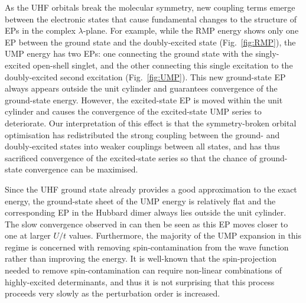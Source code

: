 \documentclass[aps,prb,reprint,noshowkeys,linenumbers,superscriptaddress]{revtex4-1}
\newcommand{\hugh}[1]{\textcolor{hughgreen}{#1}}
\begin{document}
As the UHF orbitals break the molecular symmetry, new coupling terms emerge between the electronic states that
cause fundamental changes to the structure of EPs in the complex $\lambda$-plane.
For example, while the RMP energy shows only one EP between the ground state and 
the doubly-excited state (Fig.~\ref{fig:RMP}), the UMP energy has two EPs: one connecting the ground state with the
singly-excited open-shell singlet, and the other connecting this single excitation to the 
doubly-excited second excitation (Fig.~\ref{fig:UMP}).
\hugh{%
This new ground-state EP always appears outside the unit cylinder and guarantees convergence of the ground-state energy.
However, the excited-state EP is moved within} the unit cylinder and causes the 
convergence of the excited-state UMP series to deteriorate.
\hugh{Our interpretation of this effect is that the symmetry-broken orbital optimisation has redistributed the strong 
coupling between the ground- and doubly-excited states into weaker couplings between all states, and has thus
sacrificed convergence of the excited-state series so that the chance of ground-state convergence can be maximised.}

Since the UHF ground state already provides a good approximation to the exact energy, the ground-state sheet of
the UMP energy is relatively flat and the corresponding EP in the Hubbard dimer always lies outside the unit cylinder.
\hugh{The slow convergence observed in \cite{Gill_1988} can then be seen as this EP 
moves closer to one at larger $U/t$ values.}
Furthermore, the majority of the UMP expansion in this regime is concerned with removing spin-contamination from the wave 
function \hugh{rather than improving the energy.
It is well-known that the spin-projection needed to remove spin-contamination can require non-linear combinations
of highly-excited determinants,\cite{Lowdin_1955c} and thus it is not surprising that this process proceeds 
very slowly as the perturbation order is increased.
}
\end{document}
